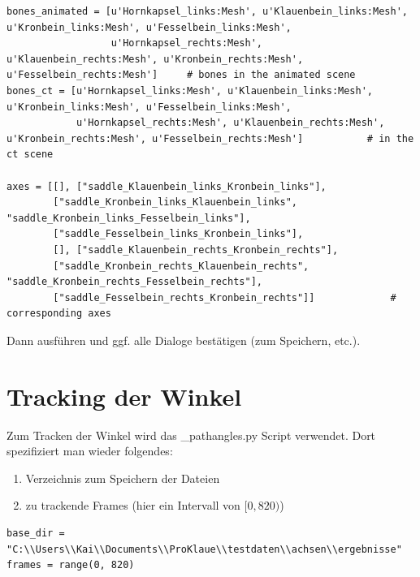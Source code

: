 \documentclass[a4paper, openany, oneside]{memoir}
\begin{document}
\begin{minipage}[c]{\textwidth}
\begin{lstlisting}
bones_animated = [u'Hornkapsel_links:Mesh', u'Klauenbein_links:Mesh', u'Kronbein_links:Mesh', u'Fesselbein_links:Mesh',
                  u'Hornkapsel_rechts:Mesh', u'Klauenbein_rechts:Mesh', u'Kronbein_rechts:Mesh', u'Fesselbein_rechts:Mesh']     # bones in the animated scene
bones_ct = [u'Hornkapsel_links:Mesh', u'Klauenbein_links:Mesh', u'Kronbein_links:Mesh', u'Fesselbein_links:Mesh',
            u'Hornkapsel_rechts:Mesh', u'Klauenbein_rechts:Mesh', u'Kronbein_rechts:Mesh', u'Fesselbein_rechts:Mesh']           # in the ct scene

axes = [[], ["saddle_Klauenbein_links_Kronbein_links"],
        ["saddle_Kronbein_links_Klauenbein_links", "saddle_Kronbein_links_Fesselbein_links"],
        ["saddle_Fesselbein_links_Kronbein_links"],
        [], ["saddle_Klauenbein_rechts_Kronbein_rechts"],
        ["saddle_Kronbein_rechts_Klauenbein_rechts", "saddle_Kronbein_rechts_Fesselbein_rechts"],
        ["saddle_Fesselbein_rechts_Kronbein_rechts"]]             # corresponding axes
\end{lstlisting}
\end{minipage}

Dann ausführen und ggf. alle Dialoge bestätigen (zum Speichern, etc.).
\pagebreak
\section{Tracking der Winkel}
Zum Tracken der Winkel wird das \File_path{angles.py} Script verwendet. Dort spezifiziert man wieder folgendes:

\begin{enumerate}
\item Verzeichnis zum Speichern der Dateien
\item zu trackende Frames (hier ein Intervall von \([0,820)\))
\end{enumerate}

\begin{minipage}[c]{\textwidth}
\begin{lstlisting}
base_dir = "C:\\Users\\Kai\\Documents\\ProKlaue\\testdaten\\achsen\\ergebnisse"
frames = range(0, 820) 
\end{lstlisting}
\end{minipage}
\end{document}
